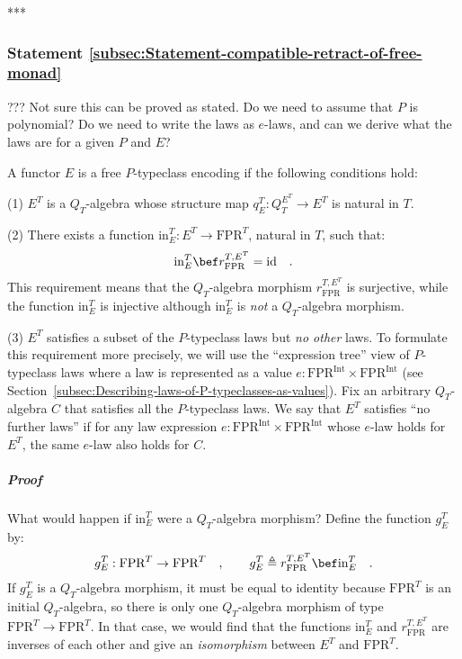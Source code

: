 {*}{*}{*}

\subsubsection{Statement \label{subsec:Statement-compatible-retract-of-free-monad}\ref{subsec:Statement-compatible-retract-of-free-monad}}

??? Not sure this can be proved as stated. Do we need to assume that
$P$ is polynomial? Do we need to write the laws as $e$-laws, and
can we derive what the laws are for a given $P$ and $E$?

A functor $E$ is a free $P$-typeclass encoding if the following
conditions hold:

(1) $E^{T}$ is a $Q_{T}$-algebra whose structure map $q_{E}^{T}:Q_{T}^{E^{T}}\rightarrow E^{T}$
is natural in $T$.

(2) There exists a function $\text{in}_{E}^{T}:E^{T}\rightarrow\text{FPR}^{T}$,
natural in $T$, such that:
\[
\text{in}_{E}^{T}\bef r_{\text{FPR}}^{T,E^{T}}=\text{id}\quad.
\]
This requirement means that the $Q_{T}$-algebra morphism $r_{\text{FPR}}^{T,E^{T}}$
is surjective, while the function $\text{in}_{E}^{T}$ is injective
although $\text{in}_{E}^{T}$ is \emph{not} a $Q_{T}$-algebra morphism.

(3) $E^{T}$ satisfies a subset of the $P$-typeclass laws but \emph{no
other} laws. To formulate this requirement more precisely, we will
use the \textsf{``}expression tree\textsf{''} view of $P$-typeclass laws where a
law is represented as a value $e:\text{FPR}^{\text{Int}}\times\text{FPR}^{\text{Int}}$
(see Section~\ref{subsec:Describing-laws-of-P-typeclasses-as-values}).
Fix an arbitrary $Q_{T}$-algebra $C$ that satisfies all the $P$-typeclass
laws. We say that $E^{T}$ satisfies \textsf{``}no further laws\textsf{''} if for
any law expression $e:\text{FPR}^{\text{Int}}\times\text{FPR}^{\text{Int}}$
whose $e$-law holds for $E^{T}$, the same $e$-law also holds for
$C$. 

\subparagraph{Proof}

What would happen if $\text{in}_{E}^{T}$ were a $Q_{T}$-algebra
morphism? Define the function $g_{E}^{T}$ by:
\begin{equation}
g_{E}^{T}:\text{FPR}^{T}\rightarrow\text{FPR}^{T}\quad,\quad\quad g_{E}^{T}\triangleq r_{\text{FPR}}^{T,E^{T}}\bef\text{in}_{E}^{T}\quad.\label{eq:definition-g-e-T-derivation1}
\end{equation}
If $g_{E}^{T}$ is a $Q_{T}$-algebra morphism, it must be equal to
identity because $\text{FPR}^{T}$ is an initial $Q_{T}$-algebra,
so there is only one $Q_{T}$-algebra morphism of type $\text{FPR}^{T}\rightarrow\text{FPR}^{T}$.
In that case, we would find that the functions $\text{in}_{E}^{T}$
and $r_{\text{FPR}}^{T,E^{T}}$ are inverses of each other and give
an \emph{isomorphism} between $E^{T}$ and $\text{FPR}^{T}$.


